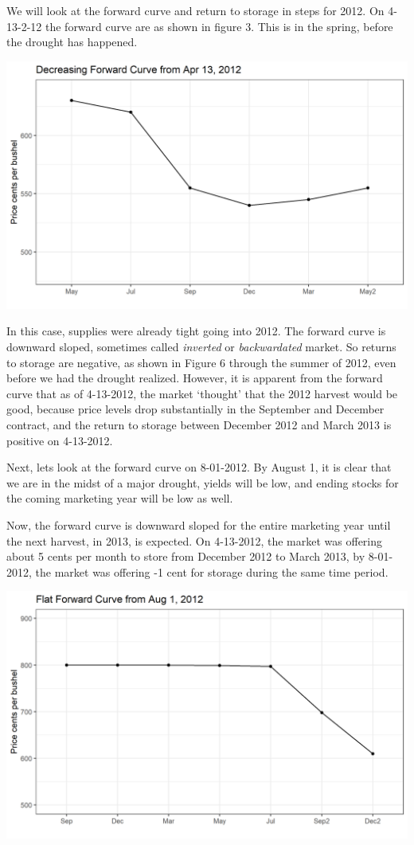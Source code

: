 \documentclass[
  letterpaper,
  DIV=11,
  numbers=noendperiod]{scrreprt}
\begin{document}
We will look at the forward curve and return to storage in steps for
2012. On 4-13-2-12 the forward curve are as shown in figure 3. This is
in the spring, before the drought has happened.

\includegraphics{assets/PricesSpaceTime-decreasing-4-13-2012.png}

In this case, supplies were already tight going into 2012. The forward
curve is downward sloped, sometimes called \emph{inverted} or
\emph{backwardated} market. So returns to storage are negative, as shown
in Figure 6 through the summer of 2012, even before we had the drought
realized. However, it is apparent from the forward curve that as of
4-13-2012, the market `thought' that the 2012 harvest would be good,
because price levels drop substantially in the September and December
contract, and the return to storage between December 2012 and March 2013
is positive on 4-13-2012.

Next, lets look at the forward curve on 8-01-2012. By August 1, it is
clear that we are in the midst of a major drought, yields will be low,
and ending stocks for the coming marketing year will be low as well.

Now, the forward curve is downward sloped for the entire marketing year
until the next harvest, in 2013, is expected. On 4-13-2012, the market
was offering about 5 cents per month to store from December 2012 to
March 2013, by 8-01-2012, the market was offering -1 cent for storage
during the same time period.

\includegraphics{assets/PricesSpaceTime-flat-8-01-2012.png}
\end{document}
